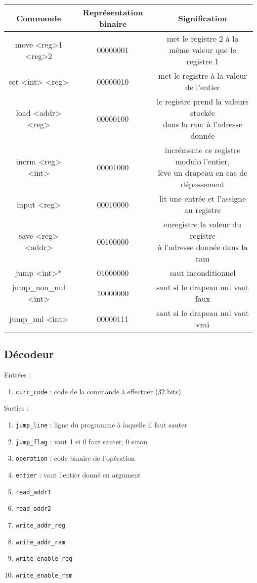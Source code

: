 \documentclass{article}
\begin{document}


\begin{tabular}{|c|c|c|}
    \hline
    Commande & Représentation binaire & Signification  \\
    \hline \hline
    move <reg>1 <reg>2 & 00000001 & met le registre 2 à la même valeur que le registre 1\\
    \hline
    set <int> <reg> & 00000010 & met le registre à la valeur de l’entier\\
    \hline
    load <addr> <reg> & 00000100 &\makecell{ le registre prend la valeurs stockée\\ dans la ram à l’adresse donnée}\\
    \hline
    incrm <reg> <int> & 00001000 & \makecell{ incrémente ce registre modulo l’entier,\\ lève un drapeau en cas de dépassement}\\
    \hline
    input <reg> & 00010000 & lit une entrée et l’assigne au registre\\
    \hline
    save <reg> <addr> & 00100000 & \makecell{enregistre la valeur du registre \\ à l’adresse donnée dans la ram}\\
    \hline
    jump <int>* & 01000000 & saut inconditionnel\\
    \hline
    jump\_non\_nul <int> & 10000000 & saut si le drapeau nul vaut faux\\
    \hline
    jump\_nul <int> & 00000111 & saut si le drapeau nul vaut vrai
    \\ \hline
\end{tabular}



\subsection{Décodeur}
Entrées :
\begin{enumerate}
    \item \texttt{curr\_code} : code de la commande à effectuer (32 bits)
\end{enumerate}

Sorties :
\begin{enumerate}
    \item \texttt{jump\_line} : ligne du programme à laquelle il faut sauter
    \item \texttt{jump\_flag} : vaut 1 si il faut sauter, 0 sinon
    \item \texttt{operation} : code binaire de l’opération
    \item \texttt{entier} : vaut l’entier donné en argument 
    \item \texttt{read\_addr1} 
    \item \texttt{read\_addr2}
    \item \texttt{write\_addr\_reg}
    \item \texttt{write\_addr\_ram}
    \item \texttt{write\_enable\_reg}
    \item \texttt{write\_enable\_ram}
\end{enumerate}
\end{document}
